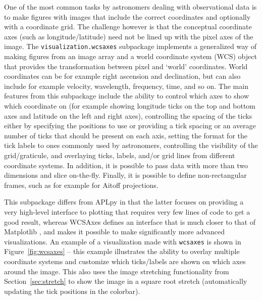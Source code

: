 \documentclass[modern]{aastex61}
\newcommand{\package}[1]{\texttt{#1}\xspace}
\begin{document}
One of the most common tasks by astronomers dealing with observational data is to make figures with images that include the correct coordinates and optionally with a coordinate grid. The challenge however is that the conceptual coordinate axes (such as longitude/latitude) need not be lined up with the pixel axes of the image. The \package{visualization.wcsaxes} subpackage implements a generalized way of making figures from an image array and a world coordinate system (WCS) object that provides the transformation between pixel and `world' coordinates. World coordinates can be for example right ascension and declination, but can also include for example velocity, wavelength, frequency, time, and so on. The main features from this subpackage include the ability to control which axes to show which coordinate on (for example showing longitude ticks on the top and bottom axes and latitude on the left and right axes), controlling the spacing of the ticks either by specifying the positions to use or providing a tick spacing or an average number of ticks that should be present on each axis, setting the format for the tick labels to ones commonly used by astronomers, controlling the visibility of the grid/graticule, and overlaying ticks, labels, and/or grid lines from different coordinate systems. In addition, it is possible to pass data with more than two dimensions and slice on-the-fly. Finally, it is possible to define non-rectangular frames, such as for example for Aitoff projections.

This subpackage differs from APLpy \citep{aplpy} in that the latter focuses on providing a very high-level interface to plotting that requires very few lines of code to get a good result, whereas WCSAxes defines an interface that is much closer to that of Matplotlib \citep{matplotlib}, and makes it possible to make significantly more advanced visualizations. An example of a visualization made with \package{wcsaxes} is shown in Figure~\ref{fig:wcsaxes} -- this example illustrates the ability to overlay multiple coordinate systems and customize which ticks/labels are shown on which axes around the image. This also uses the image stretching functionality from Section~\ref{sec:stretch} to show the image in a square root stretch (automatically updating the tick positions in the colorbar).
\end{document}
